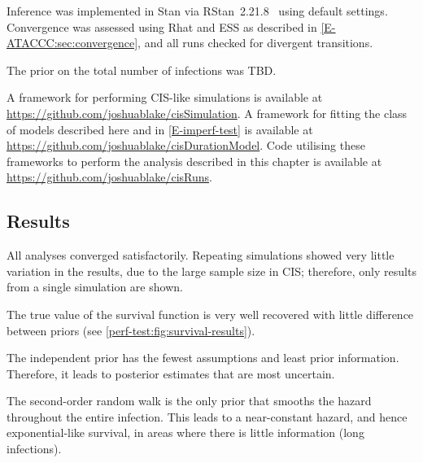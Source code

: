 \documentclass[thesis.tex]{subfiles}
\begin{document}
Inference was implemented in Stan via RStan~2.21.8~\autocite{rstan2-21-8} using default settings.
Convergence was assessed using Rhat and ESS as described in \cref{E-ATACCC:sec:convergence}, and all runs checked for divergent transitions.

The prior on the total number of infections was TBD.

A framework for performing CIS-like simulations is available at \url{https://github.com/joshuablake/cisSimulation}.
A framework for fitting the class of models described here and in \cref{E-imperf-test} is available at \url{https://github.com/joshuablake/cisDurationModel}.
Code utilising these frameworks to perform the analysis described in this chapter is available at \url{https://github.com/joshuablake/cisRuns}.

\subsection{Results}

All analyses converged satisfactorily.
Repeating simulations showed very little variation in the results, due to the large sample size in CIS; therefore, only results from a single simulation are shown.

The true value of the survival function is very well recovered with little difference between priors (see \cref{perf-test:fig:survival-results}).

The independent prior has the fewest assumptions and least prior information.
Therefore, it leads to posterior estimates that are most uncertain.

The second-order random walk is the only prior that smooths the hazard throughout the entire infection.
This leads to a near-constant hazard, and hence exponential-like survival, in areas where there is little information (long infections).
\end{document}
